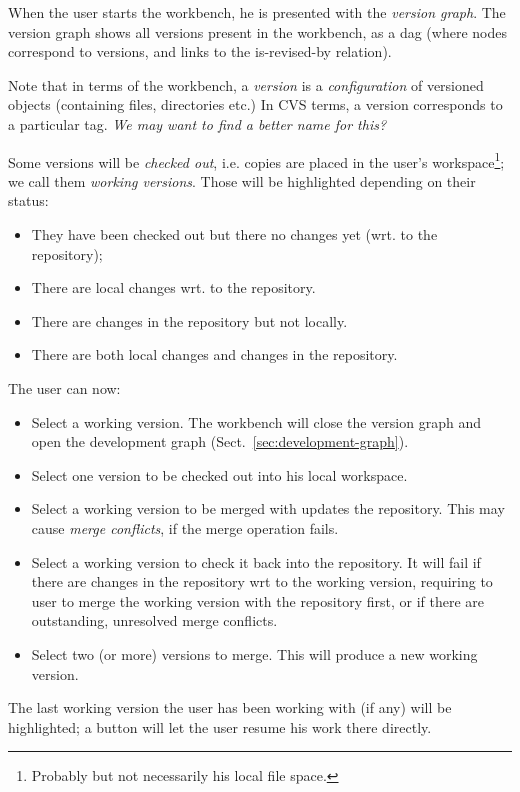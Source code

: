 \documentclass[a4paper]{article}
\begin{document}
When the user starts the workbench, he is presented with the
\emph{version graph}. The version graph shows all versions present in
the workbench, as a dag (where nodes correspond to versions, and links 
to the is-revised-by relation). 

Note that in terms of the workbench, a \emph{version} is a
\emph{configuration} of versioned objects (containing files,
directories etc.) In CVS terms, a version corresponds to a particular
tag. \emph{We may want to find a better name for this?}


Some versions will be \emph{checked out}, i.e. copies are placed in
the user's workspace\footnote{Probably but not necessarily his local
  file space.}; we call them \emph{working versions}. Those will be
highlighted depending on their status:
\begin{itemize}
\item They have been checked out but there no changes yet (wrt. to the
  repository);
\item There are local changes wrt. to the repository.
\item There are changes in the repository but not locally.
\item There are both local changes and changes in the repository.
\end{itemize}

The user can now:
\begin{itemize}
\item Select a working version. The workbench will close the version
  graph and open the development graph
  (Sect.~\ref{sec:development-graph}).
\item Select one version to be checked out into his local workspace.
\item Select a working version to be merged with updates the
  repository. This may cause \emph{merge conflicts}, if the merge
  operation fails. 
\item Select a working version to check it back into the
  repository. It will fail if there are changes in the repository wrt
  to the working version, requiring to user to merge the working
  version with the repository first, or if there are outstanding,
  unresolved merge conflicts.
\item Select two (or more) versions to merge. This will produce a new
  working version.
\end{itemize}

The last working version the user has been working with (if any) will
be highlighted; a button will let the user resume his work there
directly. 
\end{document}
